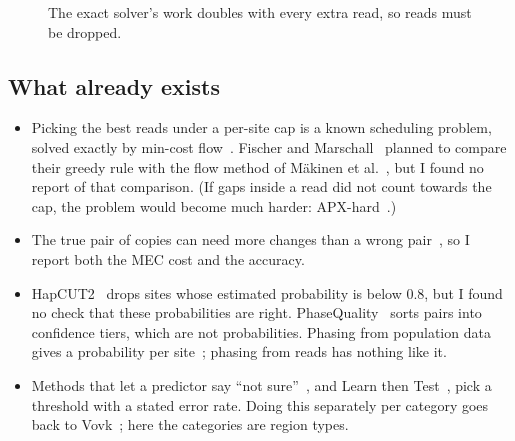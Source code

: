 \documentclass[11pt]{article}
\begin{document}
\begin{figure}[h]
\centering
{}
\caption{The exact solver's work doubles with every extra read, so reads
must be dropped.}
\label{fig:blowup}
\end{figure}

\subsection{What already exists}

\begin{itemize}
\item Picking the best reads under a per-site cap is a known scheduling
  problem, solved exactly by min-cost flow~\cite{arkin1987,carlisle1995}.
  Fischer and
  Marschall~\cite{fischer2016} planned to compare their greedy rule with
  the flow method of M\"akinen et al.~\cite{makinen2015}, but I found no
  report of that comparison. (If gaps inside a read did not count towards
  the cap, the problem would become much harder:
  APX-hard~\cite{bareyehuda2006}.)
\item The true pair of copies can need more changes than a wrong
  pair~\cite{duitama2012,majidian2020}, so I report both the MEC cost and
  the accuracy.
\item HapCUT2~\cite{hapcut2} drops sites whose
  estimated probability is below 0.8, but I found no check that these
  probabilities are right. PhaseQuality~\cite{damaraju2026} sorts pairs into
  confidence tiers, which are not probabilities. Phasing from population
  data gives a probability per site~\cite{shapeit5}; phasing from reads has
  nothing like it.
\item Methods that let a predictor say
  \enquote{not sure}~\cite{geifman2017}, and Learn then Test~\cite{ltt2025}, pick
  a threshold with a stated error rate. Doing this separately per category
  goes back to Vovk~\cite{vovk2012}; here the categories are region types.
\end{itemize}
\end{document}
